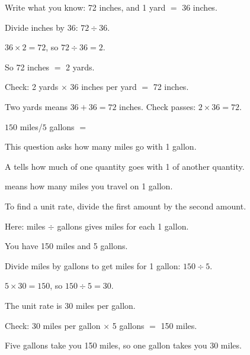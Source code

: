 \begin{steps}
  \item Write what you know: 72 inches, and 1 yard $=$ 36 inches.
  \item Divide inches by 36: $72 \div 36$.
  \item $36 \times 2 = 72$, so $72 \div 36 = 2$.
  \item So 72 inches $=$ 2 yards.
  \item Check: 2 yards $\times$ 36 inches per yard $=$ 72 inches.
\end{steps}


Two yards means $36 + 36 = 72$ inches. Check passes: $2 \times 36 = 72$.


$150$ miles/$5$ gallons $= $\ansblank


This question asks how many miles go with 1 gallon.

\begin{words}
  \item A tells how much of one quantity goes with 1 of another
        quantity.
  \item {}means how many miles you travel on 1 gallon.
  \item To find a unit rate, divide the first amount by the second amount.
  \item Here: miles $\div$ gallons gives miles for each 1 gallon.
\end{words}

\begin{steps}
  \item You have 150 miles and 5 gallons.
  \item Divide miles by gallons to get miles for 1 gallon: $150 \div 5$.
  \item $5 \times 30 = 150$, so $150 \div 5 = 30$.
  \item The unit rate is 30 miles per gallon.
  \item Check: 30 miles per gallon $\times$ 5 gallons $=$ 150 miles.
\end{steps}


Five gallons take you 150 miles, so one gallon takes you 30 miles.
